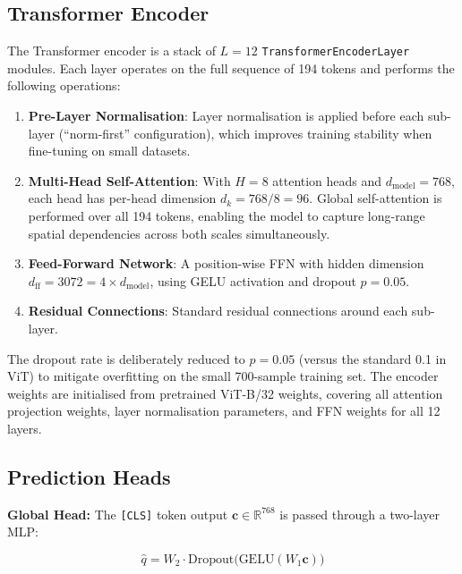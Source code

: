 \subsection{Transformer Encoder}

The Transformer encoder is a stack of $L = 12$ \texttt{TransformerEncoderLayer} modules.
Each layer operates on the full sequence of 194 tokens and performs the following
operations:

\begin{enumerate}
    \item \textbf{Pre-Layer Normalisation}: Layer normalisation is applied before each
          sub-layer (``norm-first'' configuration), which improves training stability
          when fine-tuning on small datasets.
    \item \textbf{Multi-Head Self-Attention}: With $H = 8$ attention heads and
          $d_{\text{model}} = 768$, each head has per-head dimension
          $d_k = 768 / 8 = 96$. Global self-attention is performed over all 194 tokens,
          enabling the model to capture long-range spatial dependencies across both
          scales simultaneously.
    \item \textbf{Feed-Forward Network}: A position-wise FFN with hidden dimension
          $d_{\text{ff}} = 3072 = 4 \times d_{\text{model}}$, using GELU activation and
          dropout $p = 0.05$.
    \item \textbf{Residual Connections}: Standard residual connections around each
          sub-layer.
\end{enumerate}

The dropout rate is deliberately reduced to $p = 0.05$ (versus the standard 0.1 in ViT)
to mitigate overfitting on the small 700-sample training set. The encoder weights are
initialised from pretrained ViT-B/32 weights, covering all attention projection weights,
layer normalisation parameters, and FFN weights for all 12 layers.

\subsection{Prediction Heads}

\textbf{Global Head:} The \texttt{[CLS]} token output
$\mathbf{c} \in \mathbb{R}^{768}$ is passed through a two-layer MLP:

\begin{equation}
    \hat{q} = W_2 \cdot \text{Dropout}\bigl(\text{GELU}(W_1 \mathbf{c})\bigr)
\end{equation}

